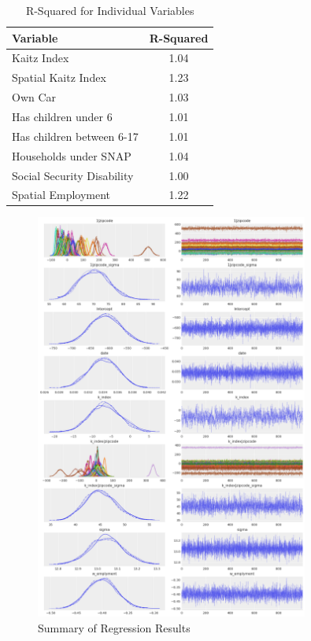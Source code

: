 \documentclass[12pt]{article}
\begin{document}
\begin{table}[H]
	\centering
	\begin{tabular}{lc}
		\toprule
		\textbf{Variable}          & \textbf{R-Squared} \\
		\midrule
		Kaitz Index                & 1.04               \\
		Spatial Kaitz Index        & 1.23               \\
		Own Car                    & 1.03               \\
		Has children under 6       & 1.01               \\
		Has children between 6-17  & 1.01               \\
		Households under SNAP      & 1.04               \\
		Social Security Disability & 1.00               \\
		Spatial Employment         & 1.22               \\
		\bottomrule
	\end{tabular}
	\caption{R-Squared for Individual Variables}
\end{table}

\begin{figure}[H]
	\centering
	\includegraphics[width=0.8\textwidth]{results.png}
	\caption{Summary of Regression Results}
\end{figure}
\end{document}
